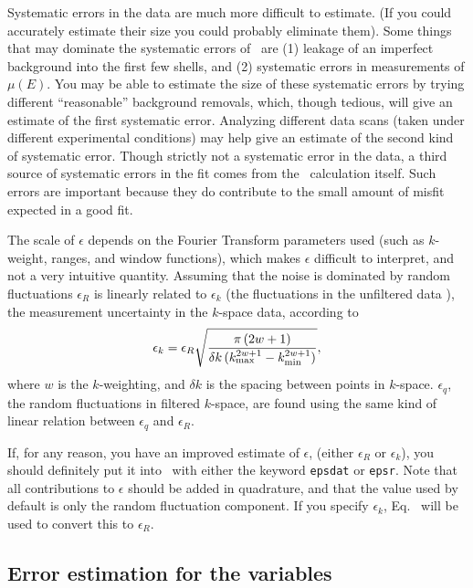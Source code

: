 {Systematic errors in the data are much more difficult to estimate. (If
you could accurately estimate their size you could probably eliminate
them).  Some things that may dominate the systematic errors of \chir\
are (1) leakage of an imperfect background into the first few shells,
and (2) systematic errors in measurements of $\mu(E)$.  You may be
able to estimate the size of these systematic errors by trying
different ``reasonable'' background removals, which, though tedious,
will give an estimate of the first systematic error.  Analyzing
different data scans (taken under different experimental conditions)
may help give an estimate of the second kind of systematic error.
Though strictly not a systematic error in the data, a third source of
systematic errors in the fit comes from the \feff\ calculation itself.
Such errors are important because they do contribute to the small
amount of misfit expected in a good fit.

The scale of $\epsilon$ depends on the Fourier Transform parameters used
(such as $k$-weight, ranges, and window functions), which makes
$\epsilon$ difficult to interpret, and not a very intuitive quantity.
Assuming that the noise is dominated by random fluctuations $\epsilon_R$
is linearly related to $\epsilon_k$ (the fluctuations in the unfiltered
data \chik), the measurement uncertainty in the $k$-space data,
according to 
\begin{equation}
\epsilon_k = \epsilon_R \sqrt{ {\pi \,(2w+1) }\over
  {\delta k \, (k_{\rm max}^{2w+1} - k_{\rm min}^{2w+1})} },
\end{equation}
\noindent where $w$ is the $k$-weighting, and $\delta k$ is the
spacing between points in $k$-space.  $\epsilon_q$, the random
fluctuations in filtered $k$-space, are found using the same kind of
linear relation between $\epsilon_q$ and $\epsilon_R$.

If, for any reason, you have an improved estimate of $\epsilon$, (either
$\epsilon_R$ or $\epsilon_k$), you should definitely put it into
\feffitinp\ with either the keyword {\tt epsdat} or {\tt epsr}. Note
that all contributions to $\epsilon$ should be added in quadrature, and
that the value used by default is only the random fluctuation
component.  If you specify $\epsilon_k$,
Eq.~{} will be used to convert this to
$\epsilon_R$.

\subsection{Error estimation for the variables}
 
}
